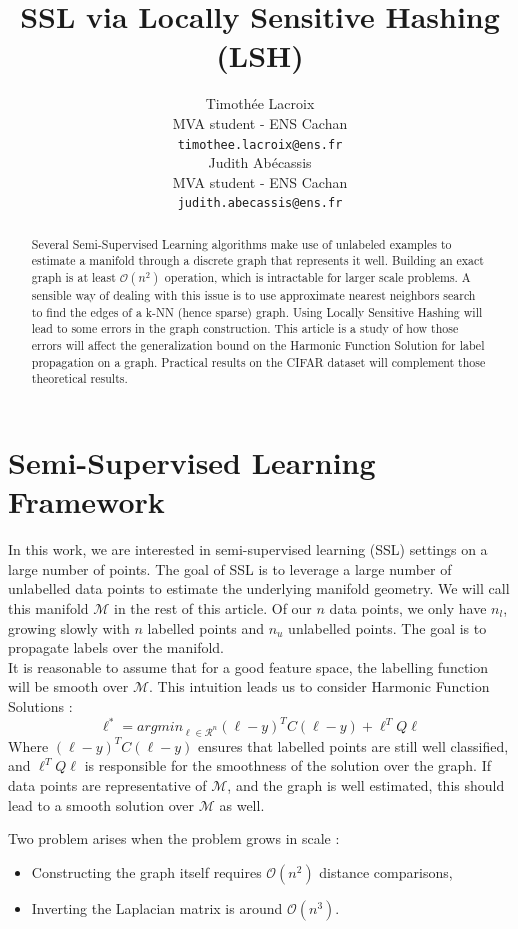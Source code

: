 \documentclass{article} %
\title{SSL via Locally Sensitive Hashing (LSH)}
\author{
Timothée Lacroix \\
MVA student - ENS Cachan\\
\texttt{timothee.lacroix@ens.fr} \\
\And
Judith Abécassis \\
MVA student - ENS Cachan \\
\texttt{judith.abecassis@ens.fr} \\
}
\begin{document}
\maketitle

\begin{abstract}
Several Semi-Supervised Learning algorithms make use of unlabeled examples to estimate a manifold through a discrete graph that represents it well. Building an exact graph is at least $\mathcal{O}(n^2)$ operation, which is intractable for larger scale problems. A sensible way of dealing with this issue is to use approximate nearest neighbors search to find the edges of a k-NN (hence sparse) graph. Using Locally Sensitive Hashing will lead to some errors in the graph construction. This article is a study of how those errors will affect the generalization bound on the Harmonic Function Solution for label propagation on a graph. Practical results on the CIFAR dataset will complement those theoretical results.
\end{abstract}


\section{Semi-Supervised Learning Framework}
In this work, we are interested in semi-supervised learning (SSL) settings on a large number of points. The goal of SSL is to leverage a large number of unlabelled data points to estimate the underlying manifold geometry. We will call this manifold $\mathcal{M}$ in the rest of this article. Of our $n$ data points, we only have $n_l$, growing slowly with $n$ labelled points and $n_u$ unlabelled points. The goal is to propagate labels over the manifold.\\
It is reasonable to assume that for a good feature space, the labelling function will be smooth over $\mathcal{M}$. This intuition leads us to consider Harmonic Function Solutions : 
$$\ell^* = argmin_{\ell \in \mathcal{R}^n} (\ell-y)^TC(\ell-y) + \ell^TQ\ell$$
Where $(\ell-y)^TC(\ell-y)$ ensures that labelled points are still well classified, and $\ell^TQ\ell$ is responsible for the smoothness of the solution over the graph. If data points are representative of $\mathcal{M}$, and the graph is well estimated, this should lead to a smooth solution over $\mathcal{M}$ as well. 

Two problem arises when the problem grows in scale :
\begin{itemize}
\item Constructing the graph itself requires $\mathcal{O}(n^2)$ distance comparisons,
\item Inverting the Laplacian matrix is around $\mathcal{O}(n^3)$.
\end{itemize}
\end{document}

